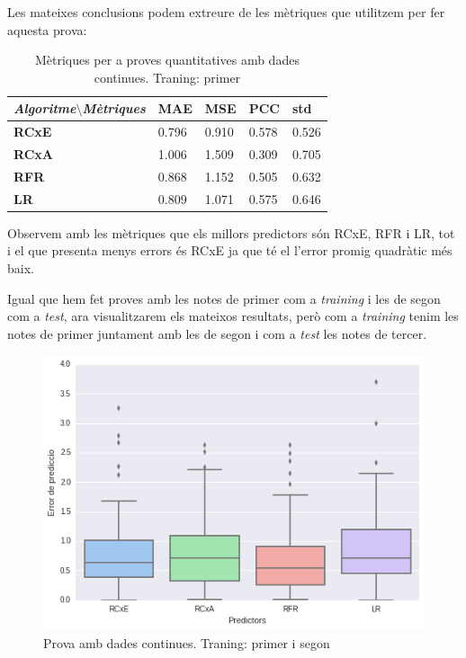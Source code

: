 \documentclass[12pt,a4paper,catalan]{article}
\begin{document}
Les mateixes conclusions podem extreure de les mètriques que utilitzem per fer aquesta prova:

\begin{table}[h]
\centering
\begin{tabular}{lllll}
\hline
\textit{\textbf{Algoritme$\setminus$Mètriques}} & \textbf{MAE} & \textbf{MSE} & \textbf{PCC} & \textbf{std} \\ \hline
\textbf{RCxE}          & 0.796          & 0.910          & 0.578          & 0.526          \\
\textbf{RCxA}          & 1.006          & 1.509          & 0.309          & 0.705          \\
\textbf{RFR}           & 0.868          & 1.152          & 0.505          & 0.632          \\
\textbf{LR}            & 0.809          & 1.071          & 0.575          & 0.646          \\ \hline
\end{tabular}
\caption{Mètriques per a proves quantitatives amb dades continues. Traning: primer}
\end{table}

Observem amb les mètriques que els millors predictors són RCxE, RFR i LR, tot i el que presenta menys errors és RCxE ja que té el l'error promig quadràtic més baix.

Igual que hem fet proves amb les notes de primer com a \textit{training} i les de segon com a \textit{test}, ara visualitzarem els mateixos resultats, però com a \textit{training} tenim les notes de primer juntament amb les de segon i com a \textit{test} les notes de tercer.

\begin{figure}[h]
\centering
\includegraphics[width=.7\linewidth]{img/boxplot_primersegon_tercer.png}
\caption{Prova amb dades continues. Traning: primer i segon}
\end{figure}
\end{document}
